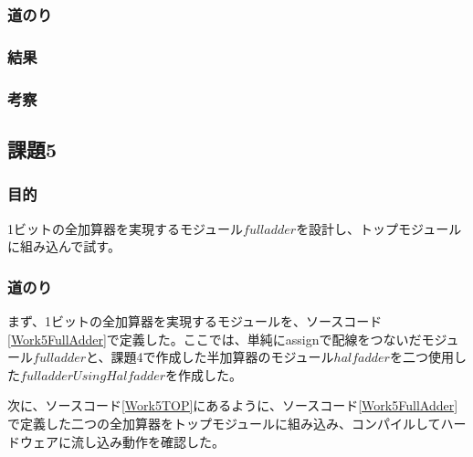 \documentclass[a4paper]{jarticle}
\begin{document}
\subsubsection{道のり}
\subsubsection{結果}
\subsubsection{考察}
\subsection{課題5}
\subsubsection{目的}
1ビットの全加算器を実現するモジュール$fulladder$を設計し、トップモジュールに組み込んで試す。
\subsubsection{道のり}
まず、1ビットの全加算器を実現するモジュールを、ソースコード\ref{Work5FullAdder}で定義した。ここでは、単純にassignで配線をつないだモジュール$fulladder$と、課題4で作成した半加算器のモジュール$halfadder$を二つ使用した$fulladderUsingHalfadder$を作成した。

次に、ソースコード\ref{Work5TOP}にあるように、ソースコード\ref{Work5FullAdder}で定義した二つの全加算器をトップモジュールに組み込み、コンパイルしてハードウェアに流し込み動作を確認した。

\end{document}

